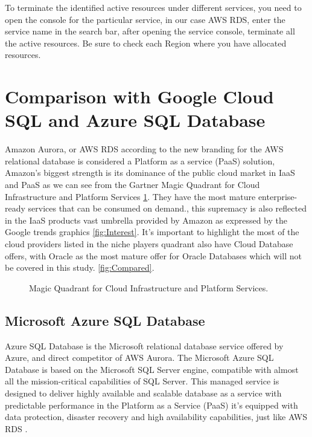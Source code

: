\documentclass{article}
\begin{document}
To terminate the identified active resources under different services, you need to open the console for the particular service, in our case AWS RDS, enter the service name in the search bar, after opening the service console, terminate all the active resources. Be sure to check each Region where you have allocated resources.


\clearpage

\section{Comparison with Google Cloud SQL and Azure SQL Database}

Amazon Aurora, or AWS RDS according to the new branding for the AWS relational database is considered a Platform as a service (PaaS) solution, Amazon’s biggest strength is its dominance of the public cloud market in IaaS and PaaS as we can see from the Gartner Magic Quadrant for Cloud Infrastructure and Platform Services \ref{fig:MagicQuadrant}. They have the most mature enterprise-ready services that can be consumed on demand.\cite{CloudPlatformComparision}, this supremacy is also reflected in the IaaS products vast umbrella provided by Amazon as expressed by the Google trends graphics \ref{fig:Interest}.
It's important to highlight the most of the cloud providers listed in the niche players quadrant also have Cloud Database offers, with Oracle as the most mature offer for Oracle Databases which will not be covered in this study. 
\ref{fig:Compared}.
\begin{figure}[hbt!]
\centering
\caption{\label{fig:MagicQuadrant} Magic Quadrant for Cloud Infrastructure and Platform Services.}
\end{figure}

\subsection{Microsoft Azure SQL Database}

Azure SQL Database is the Microsoft relational database service offered by Azure, and direct competitor of AWS Aurora. The Microsoft Azure SQL Database is based on the Microsoft SQL Server engine, compatible with almost all the mission-critical capabilities of SQL Server. This managed service is designed to deliver highly available and scalable database as a service with predictable performance in the Platform as a Service (PaaS) it's equipped with data protection, disaster recovery and high availability capabilities, just like AWS RDS \cite{mazumdar2016azure}.
\end{document}
